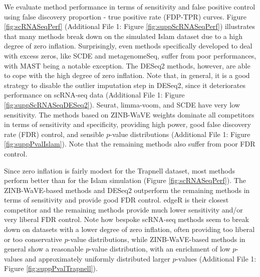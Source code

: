\documentclass{bmcart}
\newcommand{\RPack}[1]{\textsf{#1}}
\begin{document}
We evaluate method performance in terms of sensitivity and false positive control using false discovery proportion - true positive rate (FDP-TPR) curves.  
Figure \ref{fig:scRNASeqPerf} (Additional File 1: Figure \ref{fig:suppScRNASeqPerf}) illustrates that many methods break down on the simulated Islam dataset due to a high degree of zero inflation.
Surprisingly, even methods specifically developed to deal with excess zeros, like \RPack{SCDE} and \RPack{metagenomeSeq}, suffer from poor performances, with \RPack{MAST} being a notable exception.
The \RPack{DESeq2} methods, however, are able to cope with the high degree of zero inflation.
Note that, in general, it is a good strategy to disable the outlier imputation step in \RPack{DESeq2}, since it deteriorates performance on scRNA-seq data (Additional File 1: Figure \ref{fig:suppScRNASeqDESeq2}).
% 
% 
\RPack{Seurat}, limma-voom, and \RPack{SCDE} have very low sensitivity.
The methods based on ZINB-WaVE weights dominate all competitors in terms of sensitivity and specificity, providing high power, good false discovery rate (FDR) control, and sensible $p$-value distributions (Additional File 1: Figure \ref{fig:suppPvalIslam}).
Note that the remaining methods also suffer from poor FDR control.

Since zero inflation is fairly modest for the Trapnell dataset, most methods perform better than for the Islam simulation (Figure \ref{fig:scRNASeqPerf}).
The ZINB-WaVE-based methods and \RPack{DESeq2} outperform the remaining methods in terms of sensitivity and provide good FDR control.
\RPack{edgeR} is their closest competitor and the remaining methods provide much lower sensitivity and/or very liberal FDR control.
Note how bespoke scRNA-seq methods seem to break down on datasets with a lower degree of zero inflation, often providing too liberal or too conservative $p$-value distributions, while ZINB-WaVE-based methods in general show a reasonable $p$-value distribution, with an enrichment of low $p$-values and approximately uniformly distributed larger $p$-values (Additional File 1: Figure \ref{fig:suppPvalTrapnell}).
\end{document}
